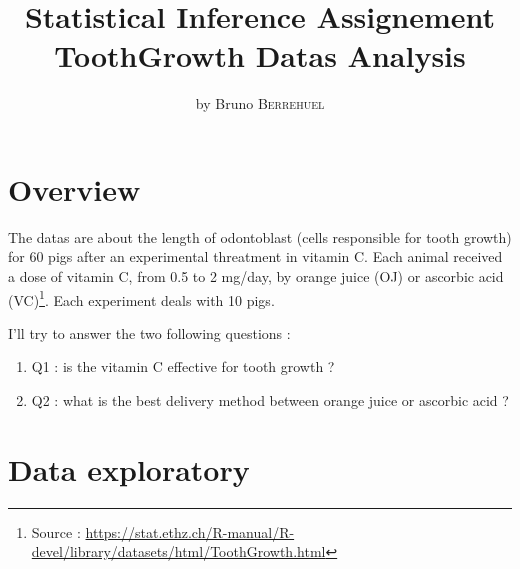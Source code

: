 \documentclass[a4paper, 11pt]{article}\usepackage[]{graphicx}\usepackage[]{color}
\title{Statistical Inference Assignement \\ ToothGrowth Datas Analysis}
\author{by Bruno \textsc{Berrehuel}}
\begin{document}
\maketitle

\section{Overview}
The datas are about the length of odontoblast (cells responsible for tooth growth) for 60 pigs after an experimental threatment in vitamin C. Each animal received a dose of vitamin C, from 0.5 to 2 mg/day, by orange juice (OJ) or ascorbic acid (VC)\footnote{Source : \url{https://stat.ethz.ch/R-manual/R-devel/library/datasets/html/ToothGrowth.html}}. Each experiment deals with 10 pigs.

\noindent
I'll try to answer the two following questions :
\begin{enumerate}
    \item Q1 : is the vitamin C effective for tooth growth ?
    \item Q2 : what is the best delivery method between orange juice or ascorbic acid ?
\end{enumerate}

\section{Data exploratory}
\end{document}

